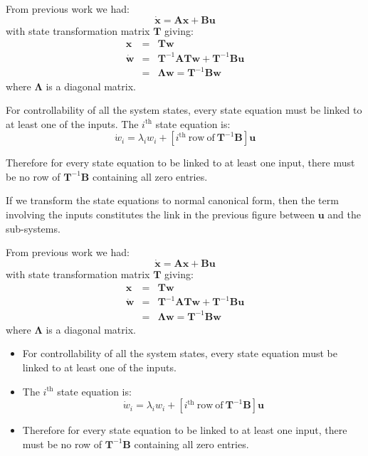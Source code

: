 From previous work we had:
\[
\dot{\mathbf{x}} = \mathbf{Ax} + \mathbf{Bu}
\]
with state transformation matrix $\mathbf{T}$ giving:
\begin{eqnarray*}
	\mathbf{x} & = & \mathbf{Tw} \\
	\dot{\mathbf{w}}& = &\mathbf{T}^{-1}\mathbf{ATw}+\mathbf{T}^{-1}\mathbf{Bu} \\
	& = & \mathbf{\Lambda w}= \mathbf{T}^{-1}\mathbf{Bw}
\end{eqnarray*}
where $\mathbf{\Lambda}$ is a diagonal matrix.
 
For controllability of all the system states, every state equation must be linked to at least one of the inputs. The $i^\mathrm{th}$ state equation is:
\[
\dot{w}_i = \lambda_iw_i + \left[i^{\mathrm{th}}\mathrm{\ row\ of\ }\mathbf{T}^{-1}\mathbf{B}\right]\mathbf{u}
\]
 
Therefore for every state equation to be linked to at least one input, there must be no row of $\mathbf{T}^{-1}\mathbf{B}$  containing all zero entries.
\ifslidesonly
\begin{slide}
   If we transform the state equations to normal canonical form, then the term involving the inputs constitutes the link in the previous figure between $\mathbf{u}$ and the sub-systems.

From previous work we had:
\[
\dot{\mathbf{x}} = \mathbf{Ax} + \mathbf{Bu}
\]
with state transformation matrix $\mathbf{T}$ giving:
\begin{eqnarray*}
	\mathbf{x} & = & \mathbf{Tw} \\
	\dot{\mathbf{w}}& = &\mathbf{T}^{-1}\mathbf{ATw}+\mathbf{T}^{-1}\mathbf{Bu} \\
	& = & \mathbf{\Lambda w}= \mathbf{T}^{-1}\mathbf{Bw}
\end{eqnarray*}
where $\mathbf{\Lambda}$ is a diagonal matrix.
\end{slide}

\begin{slide}
\begin{itemize}
	\item For controllability of all the system states, every state equation must be linked to at least one of the inputs.
	\item  The $i^\mathrm{th}$ state equation is:
	\[
	\dot{w}_i = \lambda_iw_i + \left[i^{\mathrm{th}}\mathrm{\ row\ of\ }\mathbf{T}^{-1}\mathbf{B}\right]\mathbf{u}
	\]
	\item Therefore for every state equation to be linked to at least one input, there must be no row of $\mathbf{T}^{-1}\mathbf{B}$  containing all zero entries.
\end{itemize}

\end{slide}
\fi


